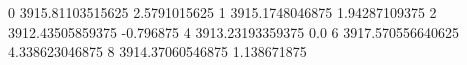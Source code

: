 0 3915.81103515625 2.5791015625
1 3915.1748046875 1.94287109375
2 3912.43505859375 -0.796875
4 3913.23193359375 0.0
6 3917.570556640625 4.338623046875
8 3914.37060546875 1.138671875

